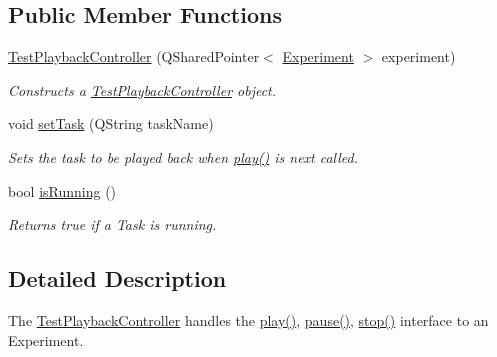 \subsection*{Public Member Functions}
\begin{DoxyCompactItemize}
\item 
\hyperlink{class_test_playback_controller_ad606d166b2f2d1a36668f4ccf127e98b}{Test\-Playback\-Controller} (Q\-Shared\-Pointer$<$ \hyperlink{class_picto_1_1_experiment}{Experiment} $>$ experiment)
\begin{DoxyCompactList}\small\item\em Constructs a \hyperlink{class_test_playback_controller}{Test\-Playback\-Controller} object. \end{DoxyCompactList}\item 
\hypertarget{class_test_playback_controller_a69f15134d7d951b609b7af88b80ae180}{void \hyperlink{class_test_playback_controller_a69f15134d7d951b609b7af88b80ae180}{set\-Task} (Q\-String task\-Name)}\label{class_test_playback_controller_a69f15134d7d951b609b7af88b80ae180}

\begin{DoxyCompactList}\small\item\em Sets the task to be played back when \hyperlink{class_test_playback_controller_a169259eb2f0c71d173efdf1b3f00bef3}{play()} is next called. \end{DoxyCompactList}\item 
\hypertarget{class_test_playback_controller_aff890606e7850a84ca37f00515814f29}{bool \hyperlink{class_test_playback_controller_aff890606e7850a84ca37f00515814f29}{is\-Running} ()}\label{class_test_playback_controller_aff890606e7850a84ca37f00515814f29}

\begin{DoxyCompactList}\small\item\em Returns true if a Task is running. \end{DoxyCompactList}\end{DoxyCompactItemize}


\subsection{Detailed Description}
The \hyperlink{class_test_playback_controller}{Test\-Playback\-Controller} handles the \hyperlink{class_test_playback_controller_a169259eb2f0c71d173efdf1b3f00bef3}{play()}, \hyperlink{class_test_playback_controller_a7699c2c9b554951f3d14214c02496b33}{pause()}, \hyperlink{class_test_playback_controller_a6a4a3a56fea5a3639094abc21b5db3ab}{stop()} interface to an Experiment. 

